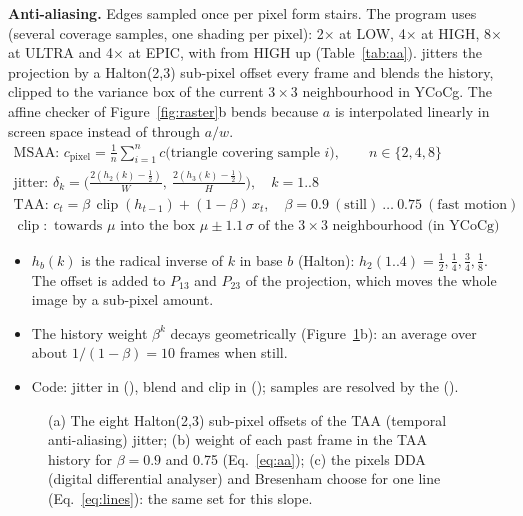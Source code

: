 \textbf{Anti-aliasing.} Edges sampled once per pixel form stairs. The program uses  (several coverage samples, one
shading per pixel): 2$\times$ at LOW, 4$\times$ at HIGH, 8$\times$ at ULTRA and 4$\times$ at EPIC, with  from HIGH up (Table~\ref{tab:aa}). 
jitters the projection by a Halton(2,3) sub-pixel offset every frame and blends the history, clipped to the
variance box of the current $3\times3$ neighbourhood in YCoCg. The affine checker of Figure~\ref{fig:raster}b bends
because $a$ is interpolated linearly in screen space instead of through $a/w$.
\begin{gather}
\text{MSAA: } c_{\text{pixel}}=\frac1n\sum_{i=1}^{n}c\big(\text{triangle covering sample } i\big),\qquad n\in\{2,4,8\}\label{eq:aa}\\
\text{jitter: } \delta_k=\Big(\frac{2(h_2(k)-\frac12)}{W},\ \frac{2(h_3(k)-\frac12)}{H}\Big),\quad k=1..8\nonumber\\
\text{TAA: } c_t=\beta\,\operatorname{clip}(h_{t-1})+(1-\beta)\,x_t,\quad \beta=0.9\ (\text{still})\ \ldots\ 0.75\ (\text{fast motion})\nonumber\\
\operatorname{clip}: \text{ towards } \mu \text{ into the box } \mu\pm1.1\,\sigma \text{ of the } 3\times3 \text{ neighbourhood (in YCoCg)}\nonumber
\end{gather}
\begin{itemize}
\item $h_b(k)$ is the radical inverse of $k$ in base $b$ (Halton): $h_2(1..4)=\frac12,\frac14,\frac34,\frac18$.
The offset is added to $P_{13}$ and $P_{23}$ of the projection, which moves the whole image by a sub-pixel amount.
\item The history weight $\beta^k$ decays geometrically (Figure~\ref{fig:aa-plots}b): an average over about
$1/(1-\beta)=10$ frames when still.
\item Code: jitter in  (), blend and clip in  ();
 samples are resolved by the  ().
\end{itemize}

\begin{figure}[htbp]
\centering{}
\caption{(a) The eight Halton(2,3) sub-pixel offsets of the TAA (temporal anti-aliasing) jitter; (b) weight of each past frame in the TAA history
for $\beta=0.9$ and 0.75 (Eq.~\eqref{eq:aa}); (c) the pixels DDA (digital differential analyser) and Bresenham choose for one line (Eq.~\eqref{eq:lines}):
the same set for this slope.}
\label{fig:aa-plots}
\end{figure}

